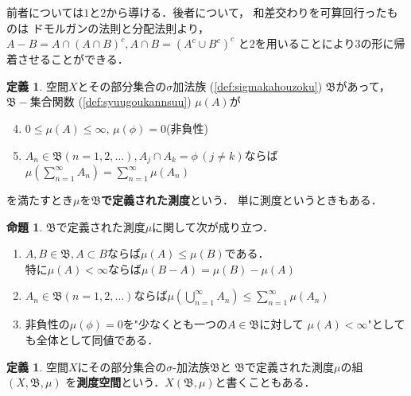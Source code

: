 \documentclass[dvipdfmx,a4paper,12pt]{jsarticle}
\makeatletter
\newcommand{\uref}[1]{\hyperref[#1]{\textcolor{TiffanyBlue}{\underline{\ref*{#1}}}}}
\theoremstyle{definition}
\newtheorem{definition}[theorem]{定義}
\newtheorem{proposition}[theorem]{命題}
\renewcommand{\proofname}{証明}
\renewenvironment{proof}[1][\proofname]{%
  \par\pushQED{\qed}%
  \normalfont \topsep6\p@\@plus6\p@\relax
  \trivlist
  \item[\hskip\labelsep\bfseries#1\@addpunct{.}]\ignorespaces
}{%
  \popQED\endtrivlist\@endpefalse
}
\makeatother
\begin{document}
\begin{proof}
    前者については$1$と$2$から導ける．後者について，
    和差交わりを可算回行ったものは
    ドモルガンの法則と分配法則より，
    $A-B=A\cap (A\cap B)^c,
    A\cap B=(A^c\cup B^c)^c$
    と$2$を用いることにより$3$の形に帰着させることができる．
\end{proof}



\begin{definition}
    空間$X$とその部分集合の$\sigma$加法族
    (\uref{def:sigmakahouzoku})
    $\mathfrak{B}$があって，$\mathfrak{B}-$集合関数
    (\uref{def:syuugoukannsuu})
    $\mu (A)$が
    \begin{enumerate}
        \setcounter{enumi}{3}
        \item $0\leq \mu (A)\leq \infty,\, \mu (\phi)=0$\quad(非負性)
        \item $A_n\in \mathfrak{B}(n=1,2,\ldots),A_j\cap A_k=\phi \, (j\neq k)$ならば
        $\displaystyle\mu \left(\sum_{n=1}^\infty A_n \right) =
         \sum_{n=1}^\infty \mu (A_n)$
    \end{enumerate}
    を満たすとき$\mu$を\textbf{$\mathfrak{B}$}\textbf{で定義された測度}という．
    単に測度というときもある．
\end{definition}


\begin{proposition}
    $\mathfrak{B}$で定義された測度$\mu$に関して次が成り立つ．
    \begin{enumerate}
        \item $A,B\in \mathfrak{B}, A\subset B$ならば$\mu (A) \leq \mu (B)$である．\\
            特に$\mu (A) < \infty$ならば$\mu (B-A)=\mu (B)-\mu (A)$
        \item $A_n\in \mathfrak{B}(n=1,2,\ldots)$ならば$\mu \left( 
            \displaystyle\bigcup_{n=1}^\infty A_n\right) \leq 
            \displaystyle\sum_{n=1}^\infty \mu (A_n)$
        \item 非負性の$\mu (\phi )=0$を"少なくとも一つの$A\in\mathfrak{B}$に対して
            $\mu (A) <\infty $"としても全体として同値である．
    \end{enumerate}
\end{proposition}


\begin{definition}
    空間$X$にその部分集合の$\sigma$-加法族$\mathfrak{B}$と
    $\mathfrak{B}$で定義された測度$\mu$の組$(X,\mathfrak{B},\mu )$
    を\textbf{測度空間}という．$X(\mathfrak{B},\mu )$と書くこともある．
\end{definition}
\end{document}
